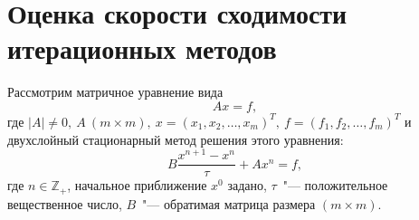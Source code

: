 \documentclass[11pt,a4paper,twoside,listtotoc,bibtotoc]{report}
\numberwithin{equation}{section}
\theoremstyle{definition}
\theoremstyle{plain}
\begin{document}
\section{Оценка скорости сходимости итерационных методов}
%
Рассмотрим матричное уравнение вида
%
\begin{equation}
    \label{eq:linear-system4}
    Ax = f,
\end{equation}
%
где
$
|A| \ne 0, ~A~(m \times m),~
x = (x_1, x_2, \ldots, x_m)^T,~
f = (f_1, f_2, \ldots, f_m)^T
$ и двухслойный стационарный метод решения этого уравнения:
%
\begin{equation}
    \label{eq:iter-process3}
    B\frac{x^{n+1} - x^n}{\tau} + Ax^n = f,
\end{equation}
%
где $n \in \mathbb{Z}_+$, начальное приближение $x^0$ задано,
$\tau$~"--- положительное вещественное число, $B$~"--- обратимая матрица
размера $(m \times m)$.
\end{document}

